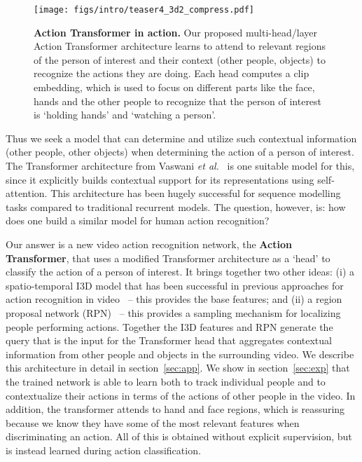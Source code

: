 \documentclass[10pt,twocolumn,letterpaper]{article}
\newcommand{\Tx}[0]{Action Transformer}
\begin{document}
\begin{figure}
\centering
\texttt{[image: figs/intro/teaser4\_3d2\_compress.pdf]}
\caption{
{\bf \Tx{} in action.}
Our proposed multi-head/layer \Tx{} architecture learns to attend to relevant regions of the person of interest and their context (other people, objects) to recognize the actions they are doing.
Each head computes a clip embedding, which is used to focus on different parts like the face, hands and the other people to recognize that the person of interest is `holding hands' and `watching a person'.
}\label{fig:teaser}
\end{figure}



Thus we seek a model that can determine and utilize such contextual
information (other people, other objects) when determining the action
of a person of interest. The Transformer architecture from Vaswani
{\it et al.}~\cite{vaswani2017attention} is one suitable model for
this, since it explicitly builds contextual support for its
representations using self-attention.  This architecture has been
hugely successful for sequence modelling tasks
compared to traditional recurrent models.
The question, however, is: how does one build a similar model for human action
recognition?

Our answer is a new video action recognition network, the {\bf \Tx{}}, that
uses a modified Transformer architecture as a `head' to classify the action of
a person of interest. It brings together two other ideas: (i) a
spatio-temporal I3D model that has been successful in previous
approaches for action recognition in video~\cite{carreira2017quo} --
this provides the base features; and (ii) a region proposal network
(RPN)~\cite{ren2015faster} -- this provides a sampling mechanism for localizing people performing actions. Together the I3D features
and RPN generate the query that is the input for the
Transformer head that
aggregates contextual information from other people and objects in the
surrounding video. We describe this architecture in detail in section~\ref{sec:app}.
We show in section~\ref{sec:exp} that the trained network 
 is able to learn both to track individual people and to contextualize their actions in terms of the actions of other people in the video. In addition, the transformer attends to hand and face regions, which is reassuring because we know they have some of the most relevant features
 when discriminating an action. All of this is obtained without explicit supervision, but is instead
learned during action classification.
\end{document}
